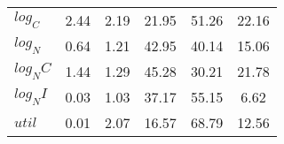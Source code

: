 \begin{center}
\begin{longtable}{lccccc}
$log_C         $	 & 	        2.44	 & 	        2.19	 & 	       21.95	 & 	       51.26	 & 	       22.16 \\ 
$log_N         $	 & 	        0.64	 & 	        1.21	 & 	       42.95	 & 	       40.14	 & 	       15.06 \\ 
$log_NC        $	 & 	        1.44	 & 	        1.29	 & 	       45.28	 & 	       30.21	 & 	       21.78 \\ 
$log_NI        $	 & 	        0.03	 & 	        1.03	 & 	       37.17	 & 	       55.15	 & 	        6.62 \\ 
$util          $	 & 	        0.01	 & 	        2.07	 & 	       16.57	 & 	       68.79	 & 	       12.56 \\ 
\end{longtable}
 \end{center}
